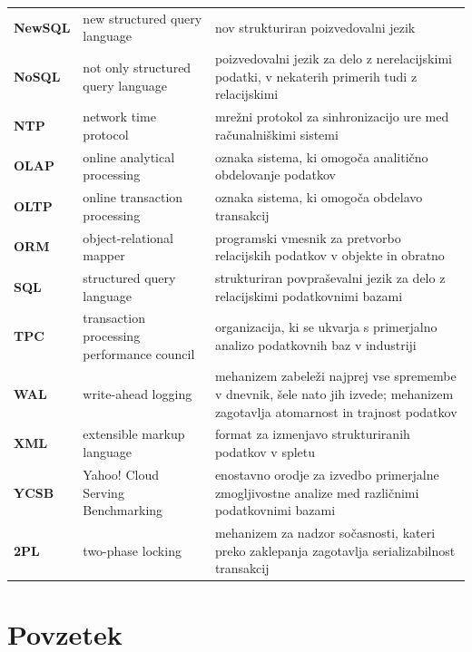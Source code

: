 \documentclass[a4paper, 12pt]{book}
\newcommand{\clearemptydoublepage}{\newpage{\pagestyle{empty}\cleardoublepage}}
\begin{document}
\begin{longtable}{p{}|p{}|p{}}
    {\bf NewSQL}& new structured query language
        & nov strukturiran poizvedovalni jezik
        \\
    {\bf NoSQL} & not only structured query language
        & poizvedovalni jezik za delo z nerelacijskimi podatki, v nekaterih primerih tudi z relacijskimi
        \\
    {\bf NTP} & network time protocol
        & mrežni protokol za sinhronizacijo ure med računalniškimi sistemi
        \\
    {\bf OLAP}  & online analytical processing
        & oznaka sistema, ki omogoča analitično obdelovanje podatkov
        \\
    {\bf OLTP}  & online transaction processing
        & oznaka sistema, ki omogoča obdelavo transakcij
        \\
    {\bf ORM}   & object-relational mapper
        & programski vmesnik za pretvorbo relacijskih podatkov v objekte in obratno
        \\
    {\bf SQL}   & structured query language    
        & strukturiran povpraševalni jezik za delo z relacijskimi podatkovnimi bazami
        \\
    {\bf TPC}   & transaction processing performance council
        &  organizacija, ki se ukvarja s primerjalno analizo podatkovnih baz v industriji
        \\
    {\bf WAL}   & write-ahead logging
        & mehanizem zabeleži najprej vse spremembe v dnevnik, šele nato jih izvede; mehanizem zagotavlja atomarnost in trajnost podatkov 
        \\
    {\bf XML}   & extensible markup language
        & format za izmenjavo strukturiranih podatkov v spletu
        \\
    {\bf YCSB}  & Yahoo! Cloud Serving Benchmarking
        & enostavno orodje za izvedbo primerjalne zmogljivostne analize med različnimi podatkovnimi bazami
        \\
    {\bf 2PL} & two-phase locking
        & mehanizem za nadzor sočasnosti, kateri preko zaklepanja zagotavlja serializabilnost transakcij
        \\
\end{longtable}


\clearemptydoublepage

\chapter*{Povzetek}
\end{document}
